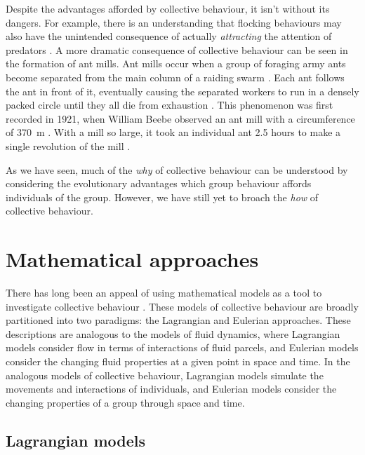 Despite the advantages afforded by collective behaviour, it isn't without its
dangers. For example, there is an understanding that flocking behaviours may
also have the unintended consequence of actually \emph{attracting} the
attention of predators \parencite{wittenberger85}. A more dramatic consequence
of collective behaviour can be seen in the formation of ant mills. Ant mills
occur when a group of foraging army ants become separated from the main column
of a raiding swarm \parencite{schneirla44}. Each ant follows the ant in front
of it, eventually causing the separated workers to run in a densely packed
circle until they all die from exhaustion \parencite{schneirla71}. This
phenomenon was first recorded in 1921, when William Beebe observed an ant mill
with a circumference of \SI{370}{\metre} \parencite{beebe21}. With a mill so
large, it took an individual ant 2.5 hours to make a single revolution of the
mill \parencite{surowiecki05}.

As we have seen, much of the \emph{why} of collective behaviour can be
understood by considering the evolutionary advantages which group behaviour
affords individuals of the group. However, we have still yet to broach the
\emph{how} of collective behaviour.

\section{Mathematical approaches}
\label{sec:models}

There has long been an appeal of using mathematical models as a tool to
investigate collective behaviour \parencite{aoki82, okubo86, reynolds87,
huth92, gueron93, vicsek95, couzin02}. These models of collective behaviour are
broadly partitioned into two paradigms: the Lagrangian and Eulerian approaches.
These descriptions are analogous to the models of fluid dynamics, where
Lagrangian models consider flow in terms of interactions of fluid parcels, and
Eulerian models consider the changing fluid properties at a given point in
space and time. In the analogous models of collective behaviour, Lagrangian
models simulate the movements and interactions of individuals, and Eulerian
models consider the changing properties of a group through space and time.

\subsection{Lagrangian models}
\label{ssec:lagrangian_models}

